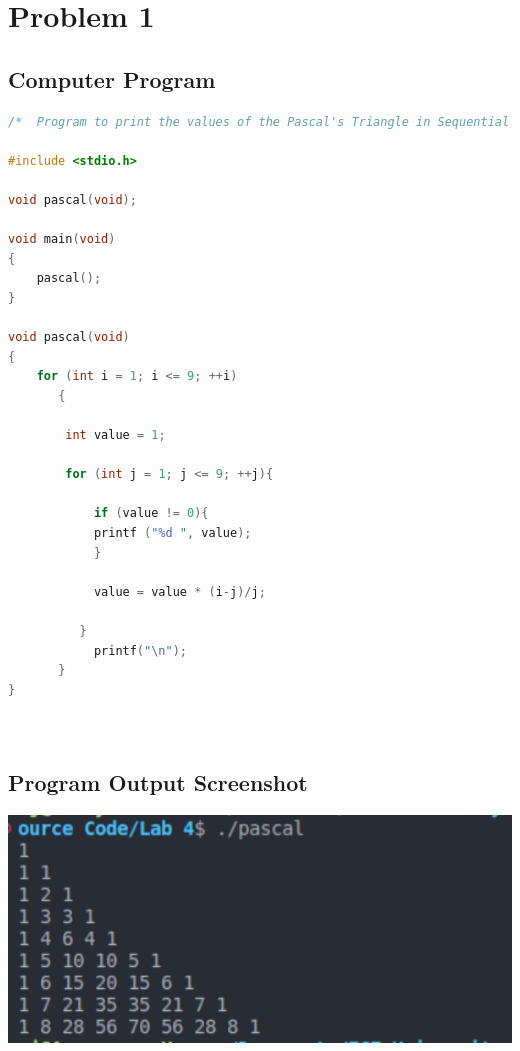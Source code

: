 {}

\section{{Problem 1}}

	\subsection{{Computer Program}}

		\begin{lstlisting}[language=C, caption=\textit{Program to print the values of the Pascal's Triangle in Sequential Order}]	
/*  Program to print the values of the Pascal's Triangle in Sequential Order    */

#include <stdio.h>

void pascal(void);

void main(void)
{
    pascal();
}

void pascal(void)
{
    for (int i = 1; i <= 9; ++i)
       {
        
        int value = 1;
        
        for (int j = 1; j <= 9; ++j){
            
            if (value != 0){
            printf ("%d ", value);
            }
            
            value = value * (i-j)/j;
            
          }
            printf("\n");
       }
}




\end{lstlisting}

	\subsection{{Program Output Screenshot}}

		\includegraphics[width=15cm]{pascal.png}
		

